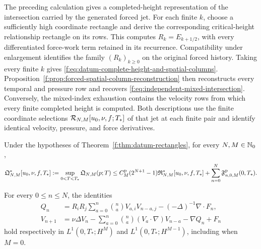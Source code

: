 The preceding calculation gives a completed-height representation of the
intersection carried by the generated forced jet. For each finite \(k\), choose a sufficiently high
coordinate rectangle and derive the corresponding critical-height
relationship rectangle on its rows.  This computes
\(R_k=E_{k+1/2}\), with every differentiated force-work term retained in its
recurrence.  Compatibility under enlargement identifies the family
\((R_k)_{k\ge0}\) on the original forced history.  Taking every finite \(k\)
gives \eqref{f:eq:datum-complete-height-and-spatial-columns}.
Proposition~\ref{f:prop:forced-spatial-column-reconstruction} then reconstructs
every temporal and pressure row and recovers
\eqref{f:eq:independent-mixed-intersection}.  Conversely, the
mixed-index exhaustion contains the velocity rows from which every finite
completed height is computed.  Both descriptions use
the finite coordinate selections \(\mathcal R_{N,M}[u_0,\nu,f;T_*]\) of that jet
at each finite pair and identify identical velocity, pressure, and force derivatives.

\begin{proposition}
\label{f:prop:rectangle-pressure-completion}
Under the hypotheses of Theorem~\ref{f:thm:datum-rectangles}, for every
\(N,M\in\mathbb N_0\),
\begin{equation}
 \mathfrak Q_{N,M}^*[u_0,\nu,f,T_*]
 :=\sup_{0<T<T_*}\mathfrak Q_{N,M}(p;T)
 \le
 C_M^{\rm p}(2^{N+1}-1)\mathfrak R_{N,M}^*[u_0,\nu,f,T_*]
 +\sum_{n=0}^N\mathfrak F^{\rm p}_{n,0,M}(0,T_*).
 \label{f:eq:whole-terminal-pressure-bound}
\end{equation}
\begin{samepage}
For every \(0\le n\le N\), the identities
\begin{align}
 Q_n
 &=R_iR_j\sum_{a=0}^n\binom naV_{a,i}V_{n-a,j}
 -(-\Delta)^{-1}\nabla\cdot F_n,
 \label{f:eq:rectangle-pressure-identity}\\
 V_{n+1}
 &=\nu\Delta V_n
 -\sum_{a=0}^n\binom na(V_a\cdot\nabla)V_{n-a}-\nabla Q_n+F_n
 \label{f:eq:rectangle-velocity-identity}
\end{align}
hold respectively in
\(L^1(0,T_*;H^M)\) and \(L^1(0,T_*;H^{M-1})\), including when
\(M=0\).
\end{samepage}
\end{proposition}

